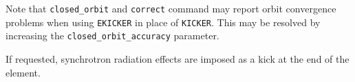 Note that \verb|closed_orbit| and \verb|correct| command may report orbit convergence problems 
when using \verb|EKICKER| in place of \verb|KICKER|. This may be resolved by increasing the
\verb|closed_orbit_accuracy| parameter.

If requested, synchrotron radiation effects are imposed as a kick at the end of the element.
